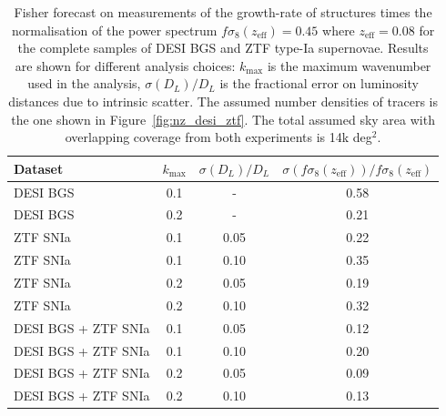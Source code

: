 \begin{table}
    \centering 
    \caption{Fisher forecast on measurements of the growth-rate of structures times the normalisation of the power spectrum 
    $f\sigma_8(z_\text{eff}) = 0.45$ where $z_\text{eff} = 0.08$ for the complete samples of DESI BGS and ZTF type-Ia supernovae. 
    Results are shown for different analysis choices: $k_\text{max}$ is the maximum wavenumber used in the analysis, 
    $\sigma(D_L)/D_L$ is the fractional error on luminosity distances due to intrinsic scatter. 
    The assumed number densities of tracers is the one shown in Figure~\ref{fig:nz_desi_ztf}. 
    The total assumed sky area with overlapping coverage from both experiments is 14k deg$^2$.
    }
    \label{tab:forecast_fs8}
    \begin{tabular}{lccc}
\hline 
\hline 
Dataset   & $k_\text{max}$  &  $\sigma(D_L)/D_L$  &     $\sigma \left(f\sigma_8(z_\text{eff})\right)/f\sigma_8(z_\text{eff})$ \\ 
\hline
DESI BGS  &  0.1 &  - &  0.58 \\
DESI BGS  &  0.2 &  - &  0.21 \\
ZTF SNIa  &  0.1 &  0.05 &  0.22 \\
ZTF SNIa  &  0.1 &  0.10 &  0.35 \\
ZTF SNIa  &  0.2 &  0.05 &  0.19 \\
ZTF SNIa  &  0.2 &  0.10 &  0.32 \\
DESI BGS + ZTF SNIa  &  0.1 &  0.05 &  0.12 \\
DESI BGS + ZTF SNIa  &  0.1 &  0.10 &  0.20 \\
DESI BGS + ZTF SNIa  &  0.2 &  0.05 &  0.09 \\
DESI BGS + ZTF SNIa  &  0.2 &  0.10 &  0.13 \\
\hline
\hline
    \end{tabular}
\end{table}




